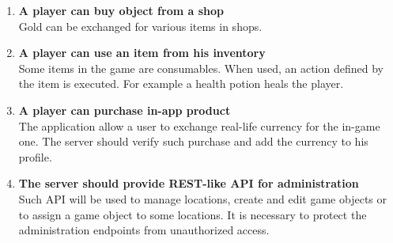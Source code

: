 \begin{enumerate}
			\item \textbf{A player can buy object from a shop} \\
			Gold can be exchanged for various items in shops.
			
			\item \textbf{A player can use an item from his inventory} \\
			Some items in the game are consumables. When used, an action defined by the item is executed. For example a health potion heals the player.
			
			\item \textbf{A player can purchase in-app product} \\
			The application allow a user to exchange real-life currency for the in-game one. The server should verify such purchase and add the currency to his profile.
			
			\item \textbf{The server should provide REST-like API for administration} \\	
			Such API will be used to manage locations, create and edit game objects or to assign a game object to some locations. It is necessary to protect the administration endpoints from unauthorized access.
			
		\end{enumerate}
		
		
